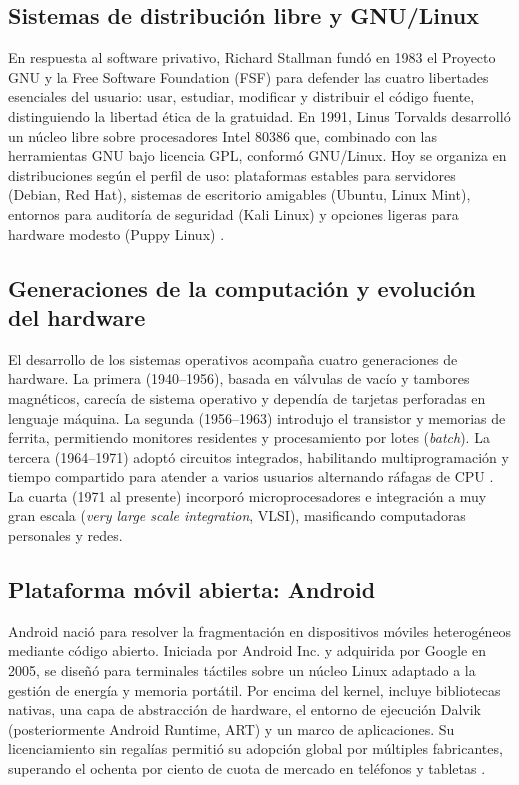 \documentclass[12pt]{article}
\begin{document}
\subsection*{Sistemas de distribución libre y GNU/Linux}

En respuesta al software privativo, Richard Stallman fundó en 1983 el Proyecto GNU y la Free Software Foundation (FSF) para defender las cuatro libertades esenciales del usuario: usar, estudiar, modificar y distribuir el código fuente, distinguiendo la libertad ética de la gratuidad. En 1991, Linus Torvalds desarrolló un núcleo libre sobre procesadores Intel 80386 que, combinado con las herramientas GNU bajo licencia GPL, conformó GNU/Linux. Hoy se organiza en distribuciones según el perfil de uso: plataformas estables para servidores (Debian, Red Hat), sistemas de escritorio amigables (Ubuntu, Linux Mint), entornos para auditoría de seguridad (Kali Linux) y opciones ligeras para hardware modesto (Puppy Linux) \parencite[plantillas 41--46]{mercado2026tema1}.

\subsection*{Generaciones de la computación y evolución del hardware}

El desarrollo de los sistemas operativos acompaña cuatro generaciones de hardware. La primera (1940--1956), basada en válvulas de vacío y tambores magnéticos, carecía de sistema operativo y dependía de tarjetas perforadas en lenguaje máquina. La segunda (1956--1963) introdujo el transistor y memorias de ferrita, permitiendo monitores residentes y procesamiento por lotes (\textit{batch}). La tercera (1964--1971) adoptó circuitos integrados, habilitando multiprogramación y tiempo compartido para atender a varios usuarios alternando ráfagas de CPU \parencite[plantilla 47]{mercado2026tema1}. La cuarta (1971 al presente) incorporó microprocesadores e integración a muy gran escala (\textit{very large scale integration}, VLSI), masificando computadoras personales y redes.

\subsection*{Plataforma móvil abierta: Android}

Android nació para resolver la fragmentación en dispositivos móviles heterogéneos mediante código abierto. Iniciada por Android Inc. y adquirida por Google en 2005, se diseñó para terminales táctiles sobre un núcleo Linux adaptado a la gestión de energía y memoria portátil. Por encima del kernel, incluye bibliotecas nativas, una capa de abstracción de hardware, el entorno de ejecución Dalvik (posteriormente Android Runtime, ART) y un marco de aplicaciones. Su licenciamiento sin regalías permitió su adopción global por múltiples fabricantes, superando el ochenta por ciento de cuota de mercado en teléfonos y tabletas \parencite[plantilla 48]{mercado2026tema1}.
\end{document}
